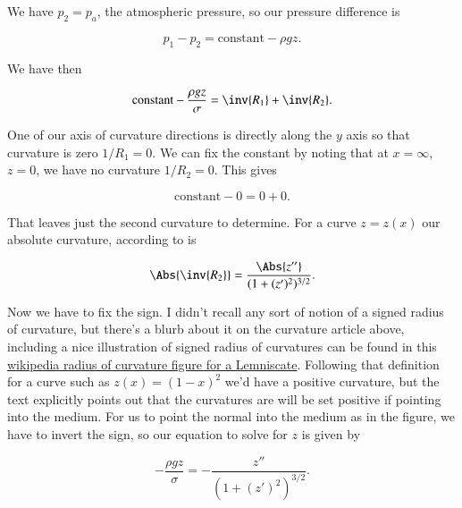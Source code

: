\begin{Answer}[ref={problem:fluids:review:q3}]
We have $p_2 = p_a$, the atmospheric pressure, so our pressure difference is

\begin{equation}\label{eqn:continuumFluidsReview:1570}
p_1 - p_2 = \text{constant} - \rho g z.
\end{equation}

We have then

\begin{equation}\label{eqn:continuumFluidsReview:1590}
\text{constant} -\frac{\rho g z}{\sigma} = \inv{R_1} + \inv{R_2}.
\end{equation}

One of our axis of curvature directions is directly along the $y$ axis so that curvature is zero $1/R_1 = 0$.  We can fix the constant by noting that at $x = \infty$, $z = 0$, we have no curvature $1/R_2 = 0$.  This gives

\begin{equation}\label{eqn:continuumFluidsReview:1690}
\text{constant} -0 = 0 + 0.
\end{equation}

That leaves just the second curvature to determine.  For a curve $z = z(x)$ our absolute curvature, according to \citep{wiki:curvature} is

\begin{equation}\label{eqn:continuumFluidsReview:1610}
\Abs{\inv{R_2}} = \frac{\Abs{z''}}{(1 + (z')^2)^{3/2}}.
\end{equation}

Now we have to fix the sign.  I didn't recall any sort of notion of a signed radius of curvature, but there's a blurb about it on the curvature article above, including a nice illustration of signed radius of curvatures can be found in this \href{http://goo.gl/Wqzz2}{wikipedia radius of curvature figure for a Lemniscate}.  Following that definition for a curve such as $z(x) = (1-x)^2$ we'd have a positive curvature, but the text explicitly points out that the curvatures are will be set positive if pointing into the medium.  For us to point the normal into the medium as in the figure, we have to invert the sign, so our equation to solve for $z$ is given by

\begin{equation}\label{eqn:continuumFluidsReview:1710}
-\frac{\rho g z}{\sigma} = -\frac{z''}{(1 + (z')^2)^{3/2}}.
\end{equation}


\end{Answer}
